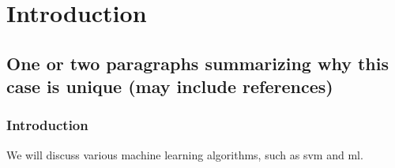\section{Introduction}

\subsection{One or two paragraphs summarizing why this case is unique (may include references)}


\begin{frame}
    \frametitle{Introduction}
    We will discuss various machine learning algorithms, such as \gls{svm} and \gls{ml}.
    \end{frame}
    